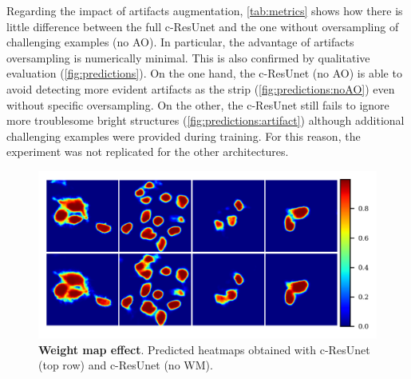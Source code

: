 Regarding the impact of artifacts augmentation, \cref{tab:metrics} shows how there is little difference between the full c-ResUnet and the one without oversampling of challenging examples (no AO).
In particular, the advantage of artifacts oversampling is numerically minimal.
This is also confirmed by qualitative evaluation (\cref{fig:predictions}).
On the one hand, the c-ResUnet (no AO) is able to avoid detecting more evident artifacts as the strip (\cref{fig:predictions:noAO}) even without specific oversampling.
On the other, the c-ResUnet  still fails to ignore more troublesome bright structures (\cref{fig:predictions:artifact}) although additional challenging examples were provided during training.
For this reason, the experiment was not replicated for the other architectures. 
\begin{figure}
\centering
\includegraphics[width=\textwidth]{figures/130_methods/weigths_effect.png}
\caption{\textbf{Weight map effect}. 
Predicted heatmaps obtained with c-ResUnet (top row) and c-ResUnet (no WM).} 
\label{fig:weigths_effect}
\end{figure}
